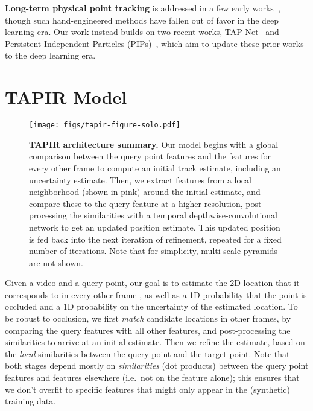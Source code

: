 \documentclass[10pt,twocolumn,letterpaper]{article}
\begin{document}
\noindent \textbf{Long-term physical point tracking} is addressed in a few early works~\cite{wang2013action,sand2008particle,liu2010sift,Rubinstein2012,Sivic2006}, though such hand-engineered methods have fallen out of favor in the deep learning era. 
Our work instead builds on two recent works, TAP-Net~\cite{doersch2022tap} and Persistent Independent Particles (PIPs)~\cite{harley2022particle}, which aim to update these prior works to the deep learning era.

\section{TAPIR Model}

\begin{figure}[t]
\begin{center}
\texttt{[image: figs/tapir-figure-solo.pdf]}
\end{center}
   \caption{\textbf{TAPIR architecture summary.}  Our model begins with a global comparison between the query point features and the features for every other frame to compute an initial track estimate, including an uncertainty estimate.  Then, we extract features from a local neighborhood (shown in pink) around the initial estimate, and compare these to the query feature at a higher resolution, post-processing the similarities with a temporal depthwise-convolutional network to get an updated position estimate.  This updated position is fed back into the next iteration of refinement, repeated for a fixed number of iterations.  Note that for simplicity, multi-scale pyramids are not shown.}
\label{fig:arch}
\end{figure}



Given a video and a query point, our goal is to estimate the 2D location   that it corresponds to in every other frame , as well as a 1D probability  that the point is occluded and a 1D probability  on the uncertainty of the estimated location.
To be robust to occlusion, we first \textit{match} candidate locations in other frames, by comparing the query features with all other features, and post-processing the similarities to arrive at an initial estimate.  Then we refine the estimate, based on the \textit{local} similarities between the query point and the target point.  Note that both stages depend mostly on {\em similarities} (dot products) between the query point features and features elsewhere (i.e.\ not on the feature alone); this ensures that we don't overfit to specific features that might only appear in the (synthetic) training data.
\end{document}
